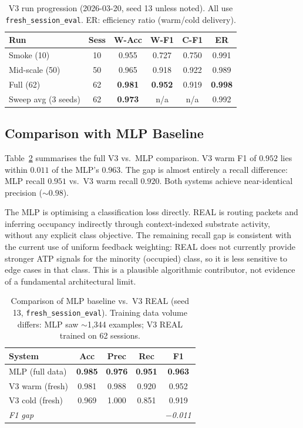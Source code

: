 \documentclass[10pt,twocolumn]{article}
\begin{document}
\begin{table}[t]
\centering
\caption{V3 run progression (2026-03-20, seed 13 unless noted).
  All use \texttt{fresh\_session\_eval}. ER: efficiency ratio (warm/cold delivery).}
\label{tab:v3_progression}
\small
\begin{tabular}{lccccc}
\toprule
Run & Sess & W-Acc & W-F1 & C-F1 & ER \\
\midrule
Smoke (10)          & 10 & 0.955 & 0.727 & 0.750 & 0.991 \\
Mid-scale (50)      & 50 & 0.965 & 0.918 & 0.922 & 0.989 \\
Full (62)           & 62 & \textbf{0.981} & \textbf{0.952} & 0.919 & \textbf{0.998} \\
Sweep avg (3 seeds) & 62 & \textbf{0.973} & n/a & n/a & 0.992 \\
\bottomrule
\end{tabular}
\end{table}

\subsection{Comparison with MLP Baseline}
\label{sec:mlp_comparison}

Table~\ref{tab:mlp_comparison} summarises the full V3 vs.\ MLP comparison.
V3 warm F1 of $0.952$ lies within $0.011$ of the MLP's $0.963$.
The gap is almost entirely a recall difference:
MLP recall $0.951$ vs.\ V3 warm recall $0.920$.
Both systems achieve near-identical precision ($\sim\!0.98$).

The MLP is optimising a classification loss directly.
REAL is routing packets and inferring occupancy indirectly through
context-indexed substrate activity, without any explicit class objective.
The remaining recall gap is consistent with the current use of uniform
feedback weighting: REAL does not currently provide stronger ATP signals
for the minority (occupied) class, so it is less sensitive to edge cases
in that class.
This is a plausible algorithmic contributor, not evidence of a fundamental
architectural limit.

\begin{table}[t]
\centering
\caption{Comparison of MLP baseline vs.\ V3 REAL (seed 13,
  \texttt{fresh\_session\_eval}).
  Training data volume differs: MLP saw $\sim$1,344 examples;
  V3 REAL trained on 62 sessions.}
\label{tab:mlp_comparison}
\small
\begin{tabular}{lcccc}
\toprule
System & Acc & Prec & Rec & F1 \\
\midrule
MLP (full data)   & \textbf{0.985} & \textbf{0.976} & \textbf{0.951} & \textbf{0.963} \\
\midrule
V3 warm (fresh)   & 0.981 & 0.988 & 0.920 & 0.952 \\
V3 cold (fresh)   & 0.969 & 1.000 & 0.851 & 0.919 \\
\midrule
\textit{F1 gap} & & & & \textit{$-$0.011} \\
\bottomrule
\end{tabular}
\end{table}
\end{document}
